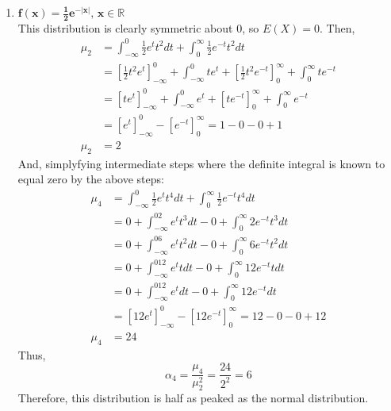 \documentclass{article}
\newcommand{\R}{\mathbb{R}}
\begin{document}
\begin{enumerate}
\begin{enumerate}
			\item $\mathbf{f(x)=\frac{1}{2}e^{-|x|}\text{, }x\in\R}$
				\bigskip \\
				This distribution is clearly symmetric about $0$, so $E(X)=0$. Then, 
				\begin{align*}
					\mu_2 	&= \int_{-\infty}^0\frac{1}{2} e^tt^2dt + \int_0^\infty\frac{1}{2} e^{-t}t^2dt 											\\ 
							&= [\frac{1}{2}t^2e^t]^0_{-\infty} + \int_{-\infty}^0te^t + [\frac{1}{2}t^2e^{-t}]_0^\infty + \int_0^\infty te^{-t}		\\
							&= [te^t]^0_{-\infty} + \int_{-\infty}^0e^t + [te^{-t}]_0^\infty + \int_0^\infty e^{-t}									\\
							&= [e^t]^0_{-\infty} - [e^{-t}]_0^\infty = 1 - 0 - 0 + 1																\\
					\mu_2	&= 2
				\end{align*}
				And, simplyfying intermediate steps where the definite integral is known to equal zero by the above steps:
				\begin{align*}
					\mu_4 	&= \int_{-\infty}^0\frac{1}{2} e^tt^4dt + \int_0^\infty\frac{1}{2} e^{-t}t^4dt 	\\
							&= 0 + \int_{-\infty}^02 e^tt^3dt - 0 + \int_0^\infty2 e^{-t}t^3dt				\\
							&= 0 + \int_{-\infty}^06 e^tt^2dt - 0 + \int_0^\infty6 e^{-t}t^2dt				\\
							&= 0 + \int_{-\infty}^012 e^ttdt - 0 + \int_0^\infty12 e^{-t}tdt				\\
							&= 0 + \int_{-\infty}^012 e^tdt - 0 + \int_0^\infty12 e^{-t}dt					\\
							&= [12e^t]^0_{-\infty} - [12e^{-t}]^\infty_0 = 12 - 0 - 0 + 12					\\
					\mu_4 	&= 24
				\end{align*}
				Thus,
				\[
					\alpha_4 = \dfrac{\mu_4}{\mu_2^2} = \dfrac{24}{2^2} = 6
				\]
				Therefore, this distribution is half as peaked as the normal distribution.
				
		\end{enumerate}
		
		
\end{enumerate}

\end{document}
